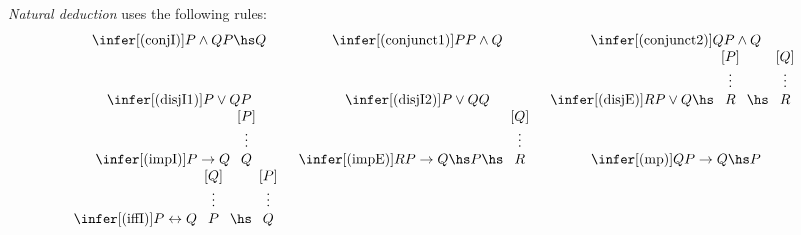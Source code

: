 \documentclass{article}
\begin{document}
\begin{definition}
	\emph{Natural deduction} uses the following rules:
	\begin{align*}
		\begin{array}{c c c}
			\infer[(\text{conjI})]{P\wedge Q}{P\hs Q}                     &
			\infer[(\text{conjunct1})]{P}{P\wedge Q}                      &
			\infer[(\text{conjunct2})]{Q}{P\wedge Q}                                   \\
			\infer[(\text{disjI1})]{P\vee Q}{P}                           &
			\infer[(\text{disjI2})]{P\vee Q}{Q}                           &
			\infer[(\text{disjE})]{R}{P\vee Q \hs \begin{array}[b]{c}
					                                      [P] \\ \vdots \\ R
				                                      \end{array}
			\hs \begin{array}[b]{c}
					    [Q] \\ \vdots \\ R
				    \end{array}}                                                     \\
			\infer[(\text{impI})]{P\to Q}{\begin{array}[b]{c}
					                              [P] \\\vdots\\Q
				                              \end{array}}             &
			\infer[(\text{impE})]{R}{P\to Q\hs P \hs \begin{array}[b]{c}
					                                         [Q] \\\vdots\\R
				                                         \end{array}}  &
			\infer[(\text{mp})]{Q}{P\to Q\hs P}                                        \\
			\infer[(\text{iffI})]{P\leftrightarrow Q}{\begin{array}[b]{c}
					                                          [Q] \\\vdots\\P
				                                          \end{array}\hs\begin{array}[b]{c}
					                                                        [P] \\\vdots\\Q

\end{array}}
\end{array}
\end{align*}
\end{definition}
\end{document}
